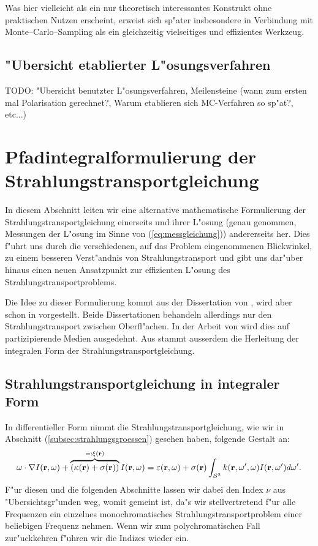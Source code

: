	Was hier vielleicht als ein nur theoretisch interessantes Konstrukt ohne praktischen Nutzen erscheint, erweist sich sp"ater insbesondere in Verbindung mit Monte--Carlo--Sampling als ein gleichzeitig vielseitiges und effizientes Werkzeug.	
	
	
	\subsection{"Ubersicht etablierter L"osungsverfahren}
	TODO: "Ubersicht benutzter L"osungsverfahren, Meilensteine (wann zum ersten mal Polarisation gerechnet?, Warum etablieren sich MC-Verfahren so sp"at?, etc...)
		
	\section{Pfadintegralformulierung der Strahlungstransportgleichung}
	In diesem Abschnitt leiten wir eine alternative mathematische Formulierung der Strahlungstransportgleichung einerseits und ihrer L"osung (genau genommen, Messungen der L"osung im Sinne von (\ref{eq:messgleichung})) andererseits her. Dies f"uhrt uns durch die verschiedenen, auf das Problem eingenommenen Blickwinkel, zu einem besseren Verst"andnis von Strahlungstransport und gibt uns dar"uber hinaus einen neuen Ansatzpunkt zur effizienten L"osung des Strahlungstransportproblems.
	
	Die Idee zu dieser Formulierung kommt aus der Dissertation von \citet{Veach:1997p9136}, wird aber schon in \citep{Arvo:1995p9257} vorgestellt. Beide Dissertationen behandeln allerdings nur den Strahlungstransport zwischen Oberfl"achen. In der Arbeit von \citet{Pauly:2000p5705} wird dies auf partizipierende Medien ausgedehnt. Aus \citep{Arvo:1993p9035} stammt ausserdem die Herleitung der integralen Form der Strahlungstransportgleichung.
	
	
	\subsection{Strahlungstransportgleichung in integraler Form}
	In differentieller Form nimmt die Strahlungstransportgleichung, wie wir in Abschnitt (\ref{subsec:strahlungsgroessen}) gesehen haben, folgende Gestalt an:
		\begin{equation}
			\omega \cdot \nabla I(\mathbf{r},\omega)+\overbrace{\left(\kappa(\mathbf{r})+\sigma(\mathbf{r})\right)}^{=:\xi(\mathbf{r})}I(\mathbf{r},\omega)=\varepsilon(\mathbf{r},\omega)+\sigma(\mathbf{r}) \int_{\mathcal{S}^2} k(\mathbf{r},\omega',\omega)I(\mathbf{r},\omega') d\omega'.
			\label{eq:diff.STG}
		\end{equation}
	F"ur diesen und die folgenden Abschnitte lassen wir dabei den Index $\nu$ aus "Ubersichtsgr"unden weg, womit gemeint ist, da"s wir stellvertretend f"ur alle Frequenzen ein einzelnes monochromatisches Strahlungstransportproblem einer beliebigen Frequenz nehmen. Wenn wir zum polychromatischen Fall zur"uckkehren f"uhren wir die Indizes wieder ein.
	
